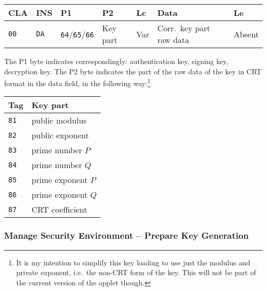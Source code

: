 \documentclass{article}
\begin{document}
\begin{flushleft}
\begin{tabular}{|l|l|l|l|l|l|l|}
\hline
CLA & INS & P1 & P2 & Lc & Data & Le \\
\hline
\texttt{00} & \texttt{DA} & \texttt{64}/\texttt{65}/\texttt{66} & Key part &
Var & Corr.\ key part raw data & Absent \\
\hline
\end{tabular}
\end{flushleft}
The P1 byte indicates correspondingly: authentication key, signing
key, decryption key.  The P2 byte indicates the part of the raw data
of the key in CRT format in the data field, in the following
way:\footnote{It is my intention to simplify this key loading to use
  just the modulus and private exponent, i.e.\ the non-CRT form of the
  key. This will not be part of the current version of the applet
  though.}
\begin{flushleft}
\begin{tabular}{|l|l|}
\hline
Tag & Key part \\
\hline
\texttt{81} & public modulus\\
\texttt{82} & public exponent\\
\texttt{83} & prime number $P$\\
\texttt{84} & prime number $Q$\\
\texttt{85} & prime exponent $P$\\
\texttt{86} & prime exponent $Q$\\
\texttt{87} & CRT coefficient\\
\hline
\end{tabular}
\end{flushleft}

\subsubsection{Manage Security Environment -- Prepare Key Generation}
\end{document}
